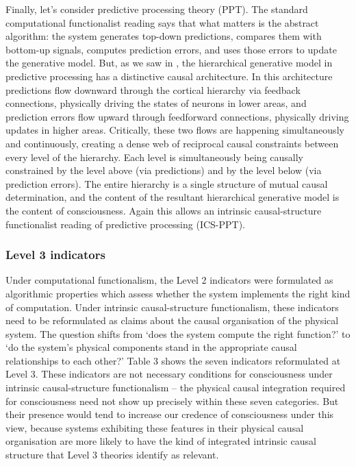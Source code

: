\documentclass[11pt, a4paper, onecolumn, gdm]{google}
\begin{document}
Finally, let's consider predictive processing theory (PPT).
The standard computational functionalist reading says that what matters is the abstract algorithm: the system generates top-down predictions, compares them with bottom-up signals, computes prediction errors, and uses those errors to update the generative model.
But, as we saw in , the hierarchical generative model in predictive processing has a distinctive causal architecture.
In this architecture predictions flow downward through the cortical hierarchy via feedback connections, physically driving the states of neurons in lower areas, and prediction errors flow upward through feedforward connections, physically driving updates in higher areas.
Critically, these two flows are happening simultaneously and continuously, creating a dense web of reciprocal causal constraints between every level of the hierarchy.
Each level is simultaneously being causally constrained by the level above (via predictions) and by the level below (via prediction errors).
The entire hierarchy is a single structure of mutual causal determination, and the content of the resultant hierarchical generative model is the content of consciousness.
Again this allows an intrinsic causal-structure functionalist reading of predictive processing (ICS-PPT).

\subsubsection*{Level 3 indicators}\label{level-3-indicators}

Under computational functionalism, the Level 2 indicators were formulated as algorithmic properties which assess whether the system implements the right kind of computation.
Under intrinsic causal-structure functionalism, these indicators need to be reformulated as claims about the causal organisation of the physical system.
The question shifts from `does the system compute the right function?' to `do the system's physical components stand in the appropriate causal relationships to each other?'
Table 3 shows the seven indicators reformulated at Level 3.
These indicators are not necessary conditions for consciousness under intrinsic causal-structure functionalism -- the physical causal integration required for consciousness need not show up precisely within these seven categories.
But their presence would tend to increase our credence of consciousness under this view, because systems exhibiting these features in their physical causal organisation are more likely to have the kind of integrated intrinsic causal structure that Level 3 theories identify as relevant.
\end{document}
